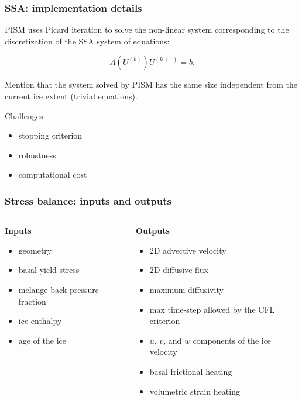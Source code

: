 \documentclass[hide notes,intlimits]{beamer}
\begin{document}
\begin{frame}
  \frametitle{SSA: implementation details}

  PISM uses Picard iteration to solve the non-linear system
  corresponding to the discretization of the SSA system of equations:

  \begin{equation*}
    \label{eq:4}
    A(U^{(k)}) U^{(k+1)} = b.
  \end{equation*}

  Mention that the system solved by PISM has the same size independent
  from the current ice extent (trivial equations).

  \medskip
  Challenges:
  \begin{itemize}
  \item stopping criterion
  \item robustness
  \item computational cost
  \end{itemize}
\end{frame}

\begin{frame}
  \frametitle{Stress balance: inputs and outputs}

  \begin{columns}[t]
    \begin{column}{0.5\linewidth}
      \textbf{Inputs}

      \begin{itemize}
      \item geometry
      \item basal yield stress
      \item melange back pressure fraction
      \item ice enthalpy
      \item age of the ice
      \end{itemize}
    \end{column}
    \begin{column}{0.5\linewidth}
      \textbf{Outputs}

      \begin{itemize}
      \item 2D advective velocity
      \item 2D diffusive flux
      \item maximum diffusivity
      \item max time-step allowed by the CFL criterion
      \item $u$, $v$, and $w$ components of the ice velocity
      \item basal frictional heating
      \item volumetric strain heating
      \end{itemize}
    \end{column}
  \end{columns}

\end{frame}
\end{document}
